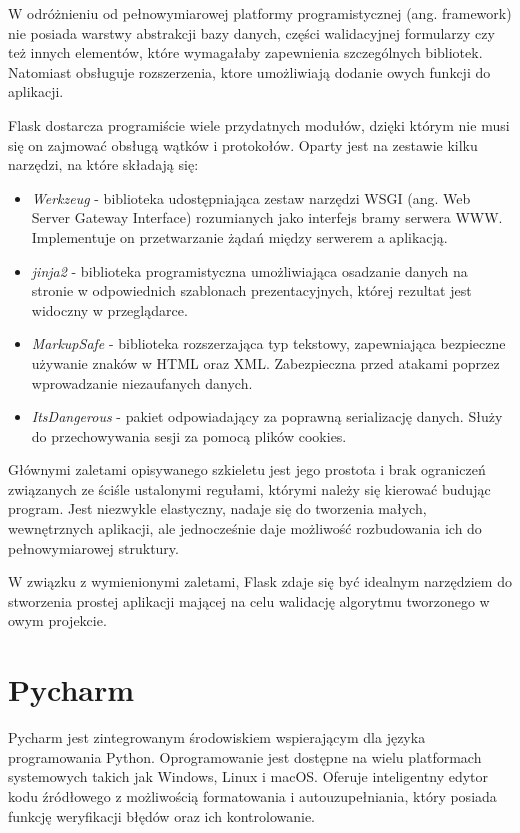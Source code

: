 W odróżnieniu od pełnowymiarowej platformy programistycznej (ang. framework) nie posiada warstwy abstrakcji bazy danych, części walidacyjnej formularzy czy też innych elementów, które wymagałaby zapewnienia szczególnych bibliotek. Natomiast obsługuje rozszerzenia, ktore umożliwiają dodanie owych funkcji do aplikacji.

Flask dostarcza programiście wiele przydatnych modułów, dzięki którym nie musi się on zajmować obsługą wątków i protokołów. Oparty jest na zestawie kilku narzędzi, na które składają się:
\begin{itemize}
\item \textit{Werkzeug} - biblioteka udostępniająca zestaw narzędzi WSGI (ang. Web Server Gateway Interface) rozumianych jako interfejs bramy serwera WWW. Implementuje on przetwarzanie żądań między serwerem a aplikacją.
\item \textit{jinja2} - biblioteka programistyczna umożliwiająca osadzanie danych na stronie w odpowiednich szablonach prezentacyjnych, której rezultat jest widoczny w przeglądarce.
\item \textit{MarkupSafe} - biblioteka rozszerzająca typ tekstowy, zapewniająca bezpieczne używanie znaków w HTML oraz XML. Zabezpieczna przed atakami poprzez wprowadzanie niezaufanych danych.
\item \textit{ItsDangerous} - pakiet odpowiadający za poprawną serializację danych. Służy do przechowywania sesji za pomocą plików cookies.
\end{itemize}

Głównymi zaletami opisywanego szkieletu jest jego prostota i brak ograniczeń związanych ze ściśle ustalonymi regułami, którymi należy się kierować budując program. Jest niezwykle elastyczny, nadaje się do tworzenia małych, wewnętrznych aplikacji, ale jednocześnie daje możliwość rozbudowania ich do pełnowymiarowej struktury. 

W związku z wymienionymi zaletami, Flask zdaje się być idealnym narzędziem do stworzenia prostej aplikacji mającej na celu walidację algorytmu tworzonego w owym projekcie.


\section{Pycharm}
Pycharm \cite{pycharm} jest zintegrowanym środowiskiem wspierającym dla języka programowania Python. Oprogramowanie jest dostępne na wielu platformach systemowych takich jak Windows, Linux i macOS. Oferuje inteligentny edytor kodu źródłowego z możliwością formatowania i autouzupełniania, który posiada funkcję weryfikacji błędów oraz ich kontrolowanie.

